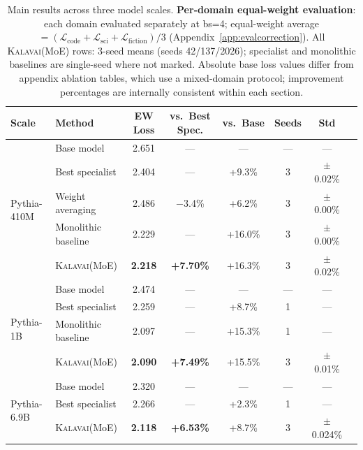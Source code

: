 \documentclass{article}
\newcommand{\kalavai}{\textsc{Kalavai}\xspace}
\begin{document}
\begin{table}[t]
\centering
\caption{Main results across three model scales. \textbf{Per-domain equal-weight evaluation}: each domain evaluated separately at bs=4; equal-weight average $= (\mathcal{L}_\text{code} + \mathcal{L}_\text{sci} + \mathcal{L}_\text{fiction})/3$ (Appendix~\ref{app:evalcorrection}). All \kalavai (MoE) rows: 3-seed means (seeds 42/137/2026); specialist and monolithic baselines are single-seed where not marked. Absolute base loss values differ from appendix ablation tables, which use a mixed-domain protocol; improvement percentages are internally consistent within each section.}
\label{tab:main}
\begin{tabular}{llcccccc}
\toprule
\textbf{Scale} & \textbf{Method} & \textbf{EW Loss} & \textbf{vs.\ Best Spec.} & \textbf{vs.\ Base} & \textbf{Seeds} & \textbf{Std} \\
\midrule
\multirow{5}{*}{Pythia-410M}
 & Base model          & 2.651 & ---     & ---     & ---  & ---       \\
 & Best specialist     & 2.404 & ---     & +9.3\%  & 3    & $\pm$0.02\% \\
 & Weight averaging    & 2.486 & $-$3.4\% & +6.2\% & 3    & $\pm$0.00\% \\
 & Monolithic baseline & 2.229 & ---     & +16.0\% & 3    & $\pm$0.00\% \\
 & \kalavai (MoE)      & \textbf{2.218} & \textbf{+7.70\%} & +16.3\% & 3 & $\pm$0.02\% \\
\midrule
\multirow{4}{*}{Pythia-1B}
 & Base model          & 2.474 & ---     & ---     & ---  & ---        \\
 & Best specialist     & 2.259 & ---     & +8.7\%  & 1    & ---        \\
 & Monolithic baseline & 2.097 & ---     & +15.3\% & 1    & ---        \\
 & \kalavai (MoE)      & \textbf{2.090} & \textbf{+7.49\%} & +15.5\% & 3 & $\pm$0.01\% \\
\midrule
\multirow{3}{*}{Pythia-6.9B}
 & Base model          & 2.320 & ---     & ---     & ---  & ---        \\
 & Best specialist     & 2.266 & ---     & +2.3\%  & 1    & ---        \\
 & \kalavai (MoE)      & \textbf{2.118} & \textbf{+6.53\%} & +8.7\%  & 3 & $\pm$0.024\% \\
\bottomrule
\end{tabular}
\end{table}
\end{document}
